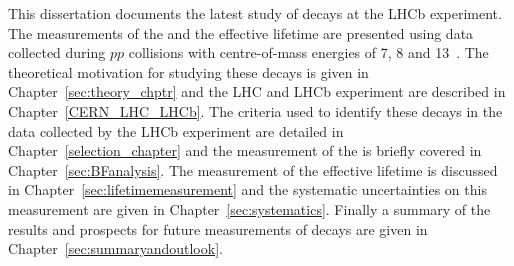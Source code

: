 This dissertation documents the latest study of \bmumu decays at the LHCb experiment. The measurements of the \bmumu \BF and the \bsmumu effective lifetime are presented using data collected during $pp$ collisions with centre-of-mass energies of 7, 8 and 13~\tev. The theoretical motivation for studying these decays is given in Chapter~\ref{sec:theory_chptr} and the LHC and LHCb experiment are described in Chapter~\ref{CERN_LHC_LHCb}. The criteria used to identify these decays in the data collected by the LHCb experiment are detailed in Chapter~\ref{selection_chapter} and the measurement of the \BF is briefly covered in Chapter~\ref{sec:BFanalysis}. The measurement of the effective lifetime is discussed in Chapter~\ref{sec:lifetimemeasurement} and the systematic uncertainties on this measurement are given in Chapter~\ref{sec:systematics}. Finally a summary of the results and prospects for future measurements of \bmumu decays are given in Chapter~\ref{sec:summaryandoutlook}.

